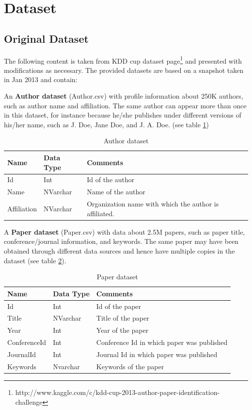 \documentclass[letterpaper,12pt]{article}
\begin{document}
\section{Dataset}
\label{sec:examples}

\subsection{Original Dataset}
The following content is taken from KDD cup dataset page\footnote{http://www.kaggle.com/c/kdd-cup-2013-author-paper-identification-challenge} and presented with modifications as necessary. The provided datasets are based on a snapshot taken in Jan 2013 and contain:

An \textbf{Author dataset} (Author.csv) with profile information about 250K authors, such as author name and affiliation. The same author can appear more than once in this dataset, for instance because he/she publishes under different versions of his/her name, such as J. Doe, Jane Doe, and J. A. Doe. (see table \ref{table:author})

\begin{table}
\centering
  \caption{Author dataset}
\begin{tabular}{ |l |l |l |}
  \hline
  \textbf{Name} & \textbf{Data Type} & \textbf{Comments} \\ \hline
  Id & Int & Id of the author\\ \hline
  Name & NVarchar &  Name of the author\\ \hline
  Affiliation & NVarchar & Organization name with which the author is affiliated.  \\ \hline
\end{tabular}
\label{table:author}
\end{table}


A \textbf{Paper dataset} (Paper.csv) with data about 2.5M papers, such as paper title, conference/journal information, and keywords. The same paper may have been obtained through different data sources and hence have multiple copies in the dataset (see table \ref{table:paper}). 

\begin{table}
\centering
  \caption{Paper dataset}
\begin{tabular}{ |l |l |l |}
  \hline
 \textbf{Name} & \textbf{Data Type} & \textbf{Comments} \\ \hline
  Id & Int & Id of the paper \\ \hline
  Title & NVarchar &  Title of the paper\\ \hline
  Year & Int & Year of the paper  \\ \hline
  ConferenceId & Int & Conference Id in which paper was published\\ \hline
  JournalId & Int & Journal Id in which paper was published \\ \hline
  Keywords & Nvarchar & Keywords of the paper \\ \hline  
\end{tabular}
\label{table:paper}
\end{table}
\end{document}
